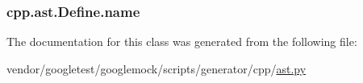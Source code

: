 \subsubsection[{\texorpdfstring{name}{name}}]{\setlength{\rightskip}{0pt plus 5cm}cpp.\+ast.\+Define.\+name}\hypertarget{classcpp_1_1ast_1_1Define_a8879216f09e88f79d7baa49bcfa10ebd}{}\label{classcpp_1_1ast_1_1Define_a8879216f09e88f79d7baa49bcfa10ebd}


The documentation for this class was generated from the following file\+:\begin{DoxyCompactItemize}
\item 
vendor/googletest/googlemock/scripts/generator/cpp/\hyperlink{ast_8py}{ast.\+py}\end{DoxyCompactItemize}
